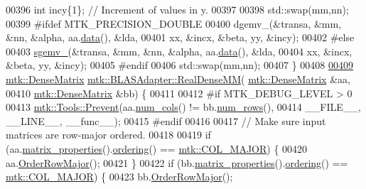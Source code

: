 \begin{DoxyCode}
00396   \textcolor{keywordtype}{int} incy\{1\};                            \textcolor{comment}{// Increment of values in y.}
00397 
00398   std::swap(mm,nn);
00399 \textcolor{preprocessor}{  #ifdef MTK\_PRECISION\_DOUBLE}
00400   dgemv\_(&transa, &mm, &nn, &alpha, aa.\hyperlink{classmtk_1_1DenseMatrix_a0c33b8a9e01d157c61ddbdf807c25d84}{data}(), &lda,
00401          xx, &incx, &beta, yy, &incy);
00402 \textcolor{preprocessor}{  #else}
00403   \hyperlink{namespacemtk_a88daff7ad6f251a58b94aa2d0c94d069}{sgemv\_}(&transa, &mm, &nn, &alpha, aa.\hyperlink{classmtk_1_1DenseMatrix_a0c33b8a9e01d157c61ddbdf807c25d84}{data}(), &lda,
00404         xx, &incx, &beta, yy, &incy);
00405 \textcolor{preprocessor}{  #endif}
00406   std::swap(mm,nn);
00407 \}
00408 
\hypertarget{mtk__blas__adapter_8cc_source_l00409}{}\hyperlink{classmtk_1_1BLASAdapter_acebd0e9bfe0bdd609c7fbea98ccfd3b5}{00409} \hyperlink{classmtk_1_1DenseMatrix}{mtk::DenseMatrix} \hyperlink{classmtk_1_1BLASAdapter_acebd0e9bfe0bdd609c7fbea98ccfd3b5}{mtk::BLASAdapter::RealDenseMM}(
      \hyperlink{classmtk_1_1DenseMatrix}{mtk::DenseMatrix} &aa,
00410                                                \hyperlink{classmtk_1_1DenseMatrix}{mtk::DenseMatrix} &bb) \{
00411 
00412 \textcolor{preprocessor}{  #if MTK\_DEBUG\_LEVEL > 0}
00413   \hyperlink{classmtk_1_1Tools_a332324c6f25e66be9dff48c5987a3b9f}{mtk::Tools::Prevent}(aa.\hyperlink{classmtk_1_1DenseMatrix_a41747502d468c6728a4be31501b16e0e}{num\_cols}() != bb.\hyperlink{classmtk_1_1DenseMatrix_a53f3afb3b6a8d21854458aaa9663cc74}{num\_rows}(),
00414                       \_\_FILE\_\_, \_\_LINE\_\_, \_\_func\_\_);
00415 \textcolor{preprocessor}{  #endif}
00416 
00417   \textcolor{comment}{// Make sure input matrices are row-major ordered.}
00418 
00419   \textcolor{keywordflow}{if} (aa.\hyperlink{classmtk_1_1DenseMatrix_a5aa83a0643f27a4652ea97630edf7143}{matrix\_properties}().\hyperlink{classmtk_1_1Matrix_a13cd17621652cd5551ff98549bd94df7}{ordering}() == 
      \hyperlink{namespacemtk_ga622801bd9f912d0f976c3e383f5f581ca7c11989c132253fb76b8f6b1314f7e13}{mtk::COL\_MAJOR}) \{
00420     aa.\hyperlink{classmtk_1_1DenseMatrix_ac2949efba3e8278335d45418c85433e4}{OrderRowMajor}();
00421   \}
00422   \textcolor{keywordflow}{if} (bb.\hyperlink{classmtk_1_1DenseMatrix_a5aa83a0643f27a4652ea97630edf7143}{matrix\_properties}().\hyperlink{classmtk_1_1Matrix_a13cd17621652cd5551ff98549bd94df7}{ordering}() == 
      \hyperlink{namespacemtk_ga622801bd9f912d0f976c3e383f5f581ca7c11989c132253fb76b8f6b1314f7e13}{mtk::COL\_MAJOR}) \{
00423     bb.\hyperlink{classmtk_1_1DenseMatrix_ac2949efba3e8278335d45418c85433e4}{OrderRowMajor}();

\end{DoxyCode}
